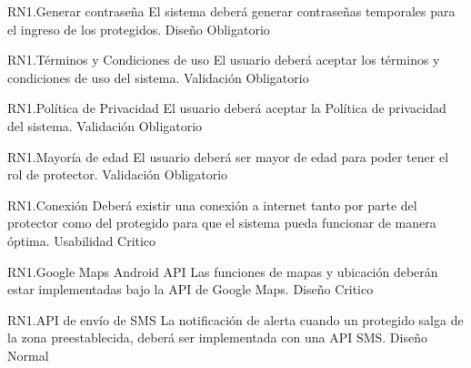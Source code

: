 \begin{BussinesRule}{RN1.}{Generar contraseña}
	\BRitem[Descripción:] El sistema deberá generar contraseñas temporales para el ingreso de los protegidos.
	\BRitem[Tipo:] Diseño
	\BRitem[Nivel:] Obligatorio
\end{BussinesRule}


\begin{BussinesRule}{RN1.}{Términos y Condiciones de uso}
	\BRitem[Descripción:] El usuario deberá aceptar los términos y condiciones de uso del sistema.
	\BRitem[Tipo:] Validación
	\BRitem[Nivel:] Obligatorio
\end{BussinesRule}


\begin{BussinesRule}{RN1.}{Política de Privacidad}
	\BRitem[Descripción:] El usuario deberá aceptar la Política de privacidad del sistema.
	\BRitem[Tipo:] Validación
	\BRitem[Nivel:] Obligatorio
\end{BussinesRule}


\begin{BussinesRule}{RN1.}{Mayoría de edad}
	\BRitem[Descripción:] El usuario deberá ser mayor de edad para poder tener el rol de protector.
	\BRitem[Tipo:] Validación
	\BRitem[Nivel:] Obligatorio
\end{BussinesRule}


\begin{BussinesRule}{RN1.}{Conexión}
	\BRitem[Descripción:] Deberá existir una conexión a internet tanto por parte del protector como del protegido para que el sistema pueda funcionar de manera óptima.
	\BRitem[Tipo:] Usabilidad
	\BRitem[Nivel:] Critico
\end{BussinesRule}


\begin{BussinesRule}{RN1.}{Google Maps Android API}
	\BRitem[Descripción:] Las funciones de mapas y ubicación deberán estar implementadas bajo la API de Google Maps.
	\BRitem[Tipo:] Diseño
	\BRitem[Nivel:] Critico
\end{BussinesRule}


\begin{BussinesRule}{RN1.}{API de envío de SMS}
	\BRitem[Descripción:] La notificación de alerta cuando un protegido salga de la zona preestablecida, deberá ser  implementada con una API SMS.
	\BRitem[Tipo:] Diseño
	\BRitem[Nivel:] Normal
\end{BussinesRule}






